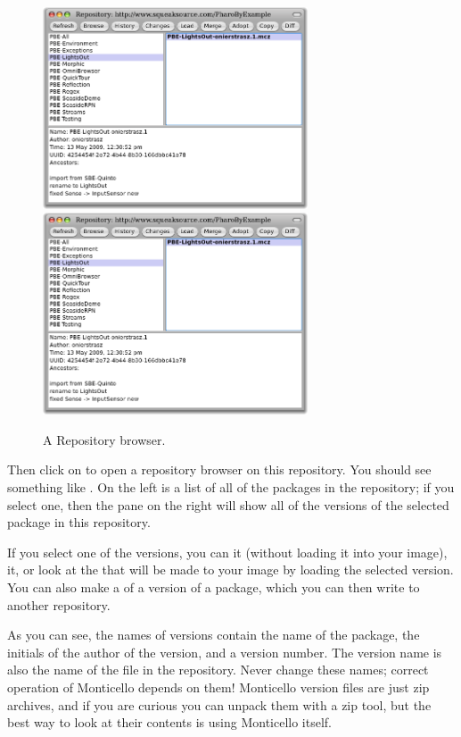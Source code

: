 \documentclass[a4paper,10pt,twoside]{book}
\begin{document}
\begin{figure}[btp]
	\begin{center}
	\ifluluelse
		{\includegraphics[width=0.7\textwidth]{SqueakSource-PBE}}
		{\includegraphics[width=0.7\textwidth]{SqueakSource-PBE}}
	\end{center}
	\caption{A Repository browser.}
\end{figure}
\noindent
Then click on  to open a repository browser on this repository.  You should see something like .  On the left is a list of all of the packages in the repository; if you select one, then the pane on the right will show all of the versions of the selected package in this repository. 

If you select one of the versions, you can  it (without loading it into your image),  it, or look at the  that will be made to your image by loading the selected version.  You can also make a  of a version of a package, which you can then write to another repository.

As you can see, the names of versions contain the name of the package, the initials of the author of the version, and a version number.  The version name is also the name of the file in the repository.  Never change these names; correct operation of Monticello depends on them!   Monticello version files are just zip archives, and if you are curious you can unpack them with a zip tool, but the best way to look at their contents is using Monticello itself.  
\end{document}
